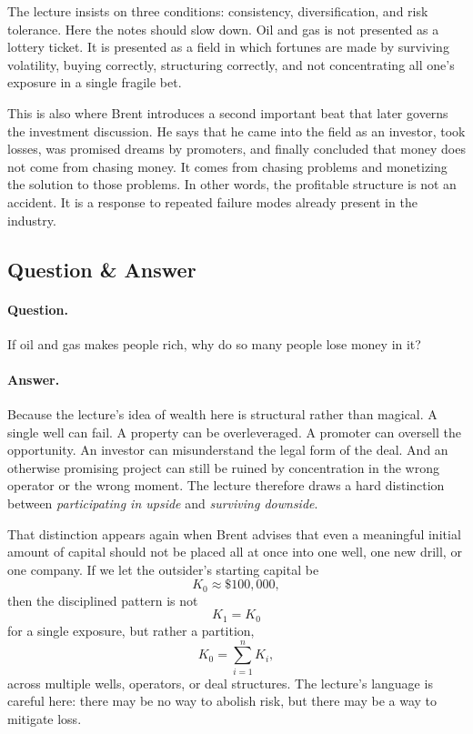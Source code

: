 The lecture insists on three conditions: consistency, diversification, and risk tolerance. Here the notes should slow down. Oil and gas is not presented as a lottery ticket. It is presented as a field in which fortunes are made by surviving volatility, buying correctly, structuring correctly, and not concentrating all one's exposure in a single fragile bet.

This is also where Brent introduces a second important beat that later governs the investment discussion. He says that he came into the field as an investor, took losses, was promised dreams by promoters, and finally concluded that money does not come from chasing money. It comes from chasing problems and monetizing the solution to those problems. In other words, the profitable structure is not an accident. It is a response to repeated failure modes already present in the industry.

\subsection{Question \& Answer}

\paragraph{Question.} If oil and gas makes people rich, why do so many people lose money in it?

\paragraph{Answer.} Because the lecture's idea of wealth here is structural rather than magical. A single well can fail. A property can be overleveraged. A promoter can oversell the opportunity. An investor can misunderstand the legal form of the deal. And an otherwise promising project can still be ruined by concentration in the wrong operator or the wrong moment. The lecture therefore draws a hard distinction between \emph{participating in upside} and \emph{surviving downside}.

That distinction appears again when Brent advises that even a meaningful initial amount of capital should not be placed all at once into one well, one new drill, or one company. If we let the outsider's starting capital be
\begin{equation}
K_0 \approx \$100{,}000,
\end{equation}
then the disciplined pattern is not
\[
K_1 = K_0
\]
for a single exposure, but rather a partition,
\begin{equation}
K_0 = \sum_{i=1}^{n} K_i,
\end{equation}
across multiple wells, operators, or deal structures. The lecture's language is careful here: there may be no way to abolish risk, but there may be a way to mitigate loss.

